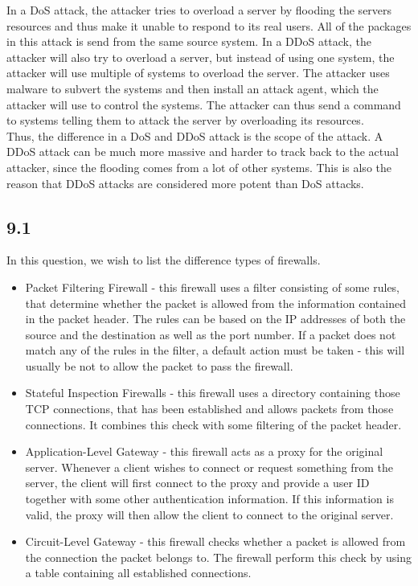 \documentclass{article}
\begin{document}
In a DoS attack, the attacker tries to overload a server by flooding the servers resources and thus make it unable to respond to its real users. All of the packages in this attack is send from the same source system. In a DDoS attack, the attacker will also try to overload a server, but instead of using one system, the attacker will use multiple of systems to overload the server. The attacker uses malware to subvert the systems and then install an attack agent, which the attacker will use to control the systems. The attacker can thus send a command to systems telling them to attack the server by overloading its resources. \\ 
Thus, the difference in a DoS and DDoS attack is the scope of the attack. A DDoS attack can be much more massive and harder to track back to the actual attacker, since the flooding comes from a lot of other systems. This is also the reason that DDoS attacks are considered more potent than DoS attacks.

\subsection{9.1}
In this question, we wish to list the difference types of firewalls.\\ 
\begin{itemize}
    \item Packet Filtering Firewall - this firewall uses a filter consisting of some rules, that determine whether the packet is allowed from the information contained in the packet header. The rules can be based on the IP addresses of both the source and the destination as well as the port number. If a packet does not match any of the rules in the filter, a default action must be taken - this will usually be not to allow the packet to pass the firewall. 
    
    \item Stateful Inspection Firewalls - this firewall uses a directory containing those TCP connections, that has been established and allows packets from those connections. It combines this check with some filtering of the packet header. 
    
    \item Application-Level Gateway - this firewall acts as a proxy for the original server. Whenever a client wishes to connect or request something from the server, the client will first connect to the proxy and provide a user ID together with some other authentication information. If this information is valid, the proxy will then allow the client to connect to the original server. 
    
    \item Circuit-Level Gateway - this firewall checks whether a packet is allowed from the connection the packet belongs to. The firewall perform this check by using a table containing all established connections. 
\end{itemize}
\end{document}
